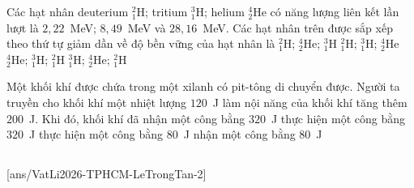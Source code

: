 	\begin{ex}%
		Các hạt nhân deuterium ${}^2_1\text{H}$; tritium ${}^3_1\text{H}$; helium ${}^4_2\text{He}$ có năng lượng liên kết lần lượt là $2{,}22$~MeV; $8{,}49$~MeV và $28{,}16$~MeV. Các hạt nhân trên được sắp xếp theo thứ tự giảm dần về độ bền vững của hạt nhân là
		\choice
		{${}^2_1\text{H}$; ${}^4_2\text{He}$; ${}^3_1\text{H}$}
		{${}^2_1\text{H}$; ${}^3_1\text{H}$; ${}^4_2\text{He}$}
		{\True ${}^4_2\text{He}$; ${}^3_1\text{H}$; ${}^2_1\text{H}$}
		{${}^3_1\text{H}$; ${}^4_2\text{He}$; ${}^2_1\text{H}$}
	\end{ex}

	\begin{ex}%
		Một khối khí được chứa trong một xilanh có pit-tông di chuyển được. Người ta truyền cho khối khí một nhiệt lượng $120$~J làm nội năng của khối khí tăng thêm $200$~J. Khi đó, khối khí đã
		\choice
		{nhận một công bằng $320$~J}
		{thực hiện một công bằng $320$~J}
		{thực hiện một công bằng $80$~J}
		{\True nhận một công bằng $80$~J}
	\end{ex}

	\subsection*{}
	\setcounter{ex}{0}
	[ans/VatLi2026-TPHCM-LeTrongTan-2]

